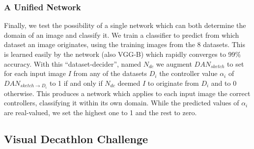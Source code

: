 \documentclass[10pt,journal,compsoc]{IEEEtran}
\begin{document}
\subsubsection{A Unified Network\label{subsec:A-Unified-Network}}

Finally, we test the possibility of a single network which can both
determine the domain of an image and classify it. We train a classifier
to predict from which dataset an image originates, using the training
images from the 8 datasets. This is learned easily by the network
(also VGG-B) which rapidly converges to 99\% accuracy. With this ``dataset-decider'',
named $N_{dc}$ we augment $DAN_{sketch}$ to set for each input image
$I$ from any of the datasets $D_{i}$ the controller value $\alpha_{i}$
of $DAN_{sketch\rightarrow D_{i}}$ to 1 if and only if $N_{dc}$
deemed $I$ to originate from $D_{i}$ and to 0 otherwise. This produces
a network which applies to each input image the correct controllers,
classifying it within its own domain. While the predicted values of
$\alpha_{i}$ are real-valued, we set the highest one to 1 and the
rest to zero. 

\subsection{Visual Decathlon Challenge \label{subsec:Visual-Decathlon-Challenge}}
\end{document}
